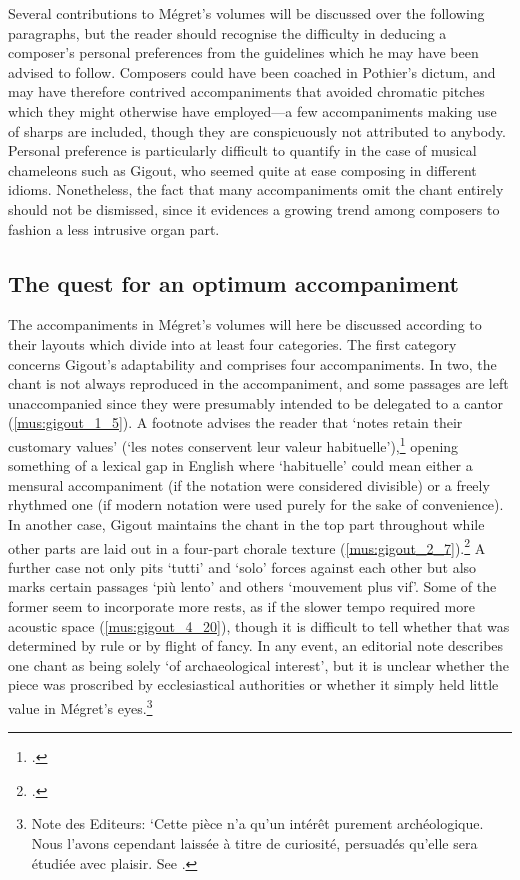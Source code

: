 Several contributions to Mégret's volumes will be discussed over the following paragraphs, but the reader should recognise the difficulty in deducing a composer's personal preferences from the guidelines which he may have been advised to follow.
Composers could have been coached in Pothier's dictum, and may have therefore contrived accompaniments that avoided chromatic pitches which they might otherwise have employed---a few accompaniments making use of sharps are included, though they are conspicuously not attributed to anybody.
Personal preference is particularly difficult to quantify in the case of musical chameleons such as Gigout, who seemed quite at ease composing in different idioms.
Nonetheless, the fact that many accompaniments omit the chant entirely should not be dismissed, since it evidences a growing trend among composers to fashion a less intrusive organ part.
\nowidow[2]

\subsection{The quest for an optimum accompaniment}
The accompaniments in Mégret's volumes will here be discussed according to their layouts which divide into at least four categories.
\label{int:gigout_megret}%
The first category concerns Gigout's adaptability and comprises four accompaniments.
In two, the chant is not always reproduced in the accompaniment, and some passages are left unaccompanied since they were presumably intended to be delegated to a cantor (\cref{mus:gigout_1_5}).
A footnote advises the reader that `notes retain their customary values' (`les notes conservent leur valeur habituelle'),\footnote{\cite[1:3, 5]{Melodieschantgregorien1892}.} opening something of a lexical gap in English where `habituelle' could mean either a mensural accompaniment (if the notation were considered divisible) or a freely rhythmed one (if modern notation were used purely for the sake of convenience).
In another case, Gigout maintains the chant in the top part throughout while other parts are laid out in a four-part chorale texture (\cref{mus:gigout_2_7}).\footnote{\cite[2:7]{Melodieschantgregorien1892}.}
A further case not only pits `tutti' and `solo' forces against each other but also marks certain passages `più lento' and others `mouvement plus vif'.
Some of the former seem to incorporate more rests, as if the slower tempo required more acoustic space (\cref{mus:gigout_4_20}), though it is difficult to tell whether that was determined by rule or by flight of fancy.
In any event, an editorial note describes one chant as being solely `of archaeological interest', but it is unclear whether the piece was proscribed by ecclesiastical authorities or whether it simply held little value in Mégret's eyes.\footnote{Note des Editeurs: `Cette pièce n'a qu'un intérêt purement archéologique. Nous l'avons cependant laissée à titre de curiosité, persuadés qu'elle sera étudiée avec plaisir. See \cite[4:20]{Melodieschantgregorien1892}.}

